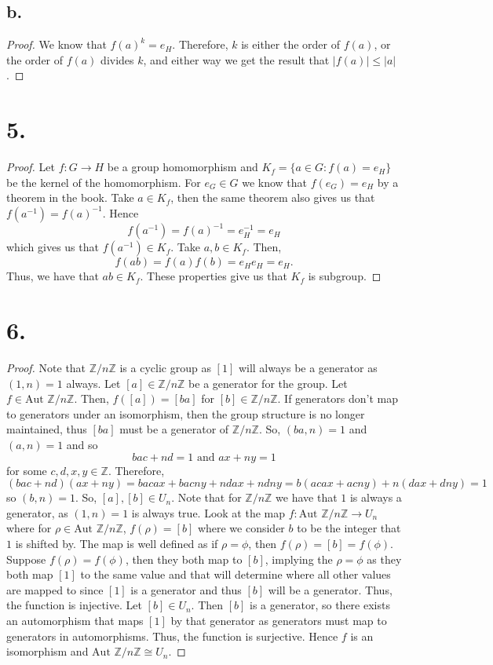 \documentclass{article}
\begin{document}
\subsection*{b.}
\begin{proof}
  We know that $f(a)^k = e_H$. Therefore, $k$ is either the order of $f(a)$, or the order of $f(a)$ divides $k$, and either way we get the result that $|f(a)| \leq |a|$. 
\end{proof}
\section*{5.}
\begin{proof}
 Let $f:G \to H$ be a group homomorphism and $K_f = \{a \in G: f(a) = e_H \}$ be the kernel of the homomorphism. For $e_G \in G$ we know that $f(e_G) = e_H$ by a theorem in the book. Take $a \in K_f$, then the same theorem also gives us that $f(a^{-1}) = f(a)^{-1}$. Hence
 \[
 f(a^{-1}) = f(a)^{-1} = e_H^{-1} = e_H 
 \]
 which gives us that $f(a^{-1}) \in K_f$. Take $a, b \in K_f$. Then, 
 \[
 f(ab) = f(a)f(b) = e_He_H = e_H. 
 \]
 Thus, we have that $ab \in K_f$. These properties give us that $K_f$ is subgroup. 
\end{proof}
\section*{6.}
\begin{proof}
  Note that $\mathbb{Z}/n\mathbb{Z}$ is a cyclic group as $[1]$ will always be a generator as $(1, n) = 1$ always. Let $[a] \in \mathbb{Z}/n\mathbb{Z}$ be a generator for the group. Let $f \in \text{Aut }\mathbb{Z}/n\mathbb{Z}$. Then, $f([a]) = [ba]$ for $[b] \in \mathbb{Z}/n\mathbb{Z}$. If generators don't map to generators under an isomorphism, then the group structure is no longer maintained, thus $[ba]$ must be a generator of $\mathbb{Z}/n\mathbb{Z}$. So, $(ba, n ) = 1$ and $(a, n) = 1$ and so 
  \[
   bac + nd = 1 \text{ and } ax + ny = 1 
  \]
  for some $c, d, x, y \in \mathbb{Z}$. Therefore, 
  \[
   (bac + nd)(ax + ny) = bacax + bacny + ndax + ndny = b(acax + acny) + n(dax + dny) = 1 
  \]
  so $(b, n) = 1$. So, $[a], [b] \in U_n$. Note that for $\mathbb{Z}/n\mathbb{Z}$ we have that $1$ is always a generator, as $(1, n) = 1$ is always true. Look at the map $f:\text{Aut }\mathbb{Z}/n\mathbb{Z} \to U_n$ where for $\rho \in \text{Aut }\mathbb{Z}/n\mathbb{Z}$, $f(\rho) = [b]$ where we consider $b$ to be the integer that $1$ is shifted by. The map is well defined as if $\rho = \phi$, then $f(\rho) = [b] = f(\phi)$. Suppose $f(\rho) = f(\phi)$, then they both map to $[b]$, implying the $\rho = \phi$ as they both map $[1]$ to the same value and that will determine where all other values are mapped to since $[1]$ is a generator and thus $[b]$ will be a generator. Thus, the function is injective. Let $[b] \in U_n$. Then $[b]$ is a generator, so there exists an automorphism that maps $[1]$ by that generator as generators must map to generators in automorphisms. Thus, the function is surjective. Hence $f$ is an isomorphism and $\text{Aut }\mathbb{Z}/n\mathbb{Z} \cong U_n$. 
\end{proof}
\end{document}
